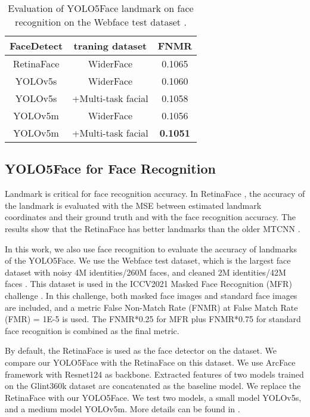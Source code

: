 \documentclass[conference]{IEEEtran}
\begin{document}
\begin{table}[tb]
    \centering
    \begin{tabular}{c|c|c}
        \hline
        FaceDetect & traning dataset & FNMR\\
        \hline
        RetinaFace\cite{RetinaFace} & WiderFace \cite{WiderFace} & 0.1065 \\
        YOLOv5s &  WiderFace & 0.1060\\
        YOLOv5s &  +Multi-task facial\cite{Multi-task-facial} & 0.1058\\        
        YOLOv5m & WiderFace & 0.1056\\
        YOLOv5m & +Multi-task facial & \textbf{0.1051}\\        
        \hline
    \end{tabular}
    \caption{Evaluation of YOLO5Face landmark on face recognition on the Webface test dataset \cite{webface}.}
    \label{t3}
\end{table}

\subsection{YOLO5Face for Face Recognition}

Landmark is critical for face recognition accuracy. In RetinaFace \cite{RetinaFace}, the accuracy of the landmark is evaluated with the MSE between estimated landmark coordinates and their ground truth and with the face recognition accuracy. The results show that the RetinaFace has better landmarks than the older MTCNN \cite{MTCNN}. 

In this work, we also use face recognition to evaluate the accuracy of landmarks of the YOLO5Face. We use the Webface test dataset, which is the largest face dataset with noisy 4M identities/260M faces, and cleaned 2M identities/42M faces \cite{webface}. This dataset is used in the ICCV2021 Masked Face Recognition (MFR) challenge \cite{ICCV21MFR}. In this challenge, both masked face images and standard face images are included, and a metric False Non-Match Rate (FNMR) at False Match Rate (FMR) = 1E-5 is used. The FNMR*0.25 for MFR plus FNMR*0.75 for standard face recognition is combined as the final metric. 

By default, the RetinaFace \cite{ResNet-D} is used as the face detector on the dataset. We compare our YOLO5Face with the RetinaFace on this dataset. We use ArcFace \cite{ArcFace} framework with Resnet124 \cite{Resnet} as backbone. Extracted features of two models trained on the Glint360k dataset \cite{glint360} are concatenated as the baseline model. We replace the  RetinaFace with our YOLO5Face. We test two models, a small model YOLOv5s, and a medium model YOLOv5m. More details can be found in \cite{ourMFR}. 
\end{document}
